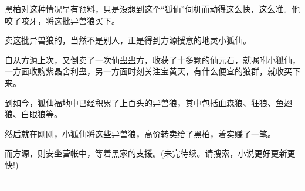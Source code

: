 \begin{this_body}
黑柏对这种情况早有预料，只是没想到这个“狐仙”伺机而动得这么快，这么准。他咬了咬牙，将这批异兽狼买下。

卖这批异兽狼的，当然不是别人，正是得到方源授意的地灵小狐仙。

自从方源上次，又倒卖了一次仙蛊蛊方，收获了十多颗的仙元石，就嘱咐小狐仙，一方面收购紫晶舍利蛊，另一方面时刻关注宝黄天，有什么便宜的狼群，就收买下来。

到如今，狐仙福地中已经积累了上百头的异兽狼，其中包括血森狼、狂狼、鱼翅狼、白眼狼等。

然后就在刚刚，小狐仙将这些异兽狼，高价转卖给了黑柏，着实赚了一笔。

而方源，则安坐营帐中，等着黑家的支援。(未完待续。请搜索，小说更好更新更快!)

------------

\end{this_body}

